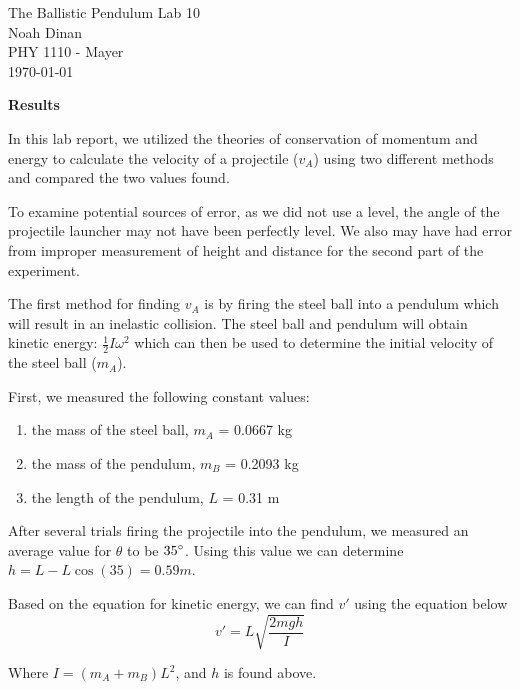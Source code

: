 \documentclass[12pt]{article}
\begin{document}
\begin{center}
\vspace*{\fill}
The Ballistic Pendulum Lab 10 \\ Noah Dinan \\ PHY 1110 - Mayer \\ \today \\
\vspace*{\fill}
\end{center}

\newpage
{} %
\setlength{\parindent}{0in}

\textbf{Results}

In this lab report, we utilized the theories of conservation of momentum and energy to calculate the velocity
of a projectile ($v_A$) using two different methods and compared the two values found.

To examine potential sources of error, as we did not use a level, the angle of the projectile launcher
may not have been perfectly level. We also may have had error from
improper measurement of height and distance for the second part of the experiment.

\vspace{0.5cm}

The first method for finding $v_A$ is by firing the steel ball into a pendulum which will result in an inelastic
collision. The steel ball and pendulum will obtain kinetic energy: $\frac{1}{2}I\omega^2$ which can then be used to
determine the initial velocity of the steel ball ($m_A$).

First, we measured the following constant values:
\begin{enumerate}
    \item the mass of the steel ball, $m_A$ = 0.0667 kg
    \item the mass of the pendulum, $m_B$ = 0.2093 kg
    \item the length of the pendulum, $L$ = 0.31 m
\end{enumerate}

After several trials firing the projectile into the pendulum, we measured an average value for $\theta$
to be $\text{35}\degree$. Using this value we can determine $h = L - L\cos(35) = 0.59 m$.

Based on the equation for kinetic energy, we can find $v\prime$ using the equation below
\[ v\prime = L\sqrt{\frac{2mgh}{I}} \]

Where $I = (m_A + m_B)L^2$, and $h$ is found above.
\end{document}
